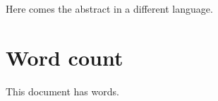 

\begin{abstract}
  Here come 3--6 sentences describing your thesis.
\end{abstract}

\begin{xabstract}[Sammendrag]               %
  Here comes the abstract in a different language.
\end{xabstract}

\section{Word count}

\begin{center}
This document has \wordcount words.
\end{center}
